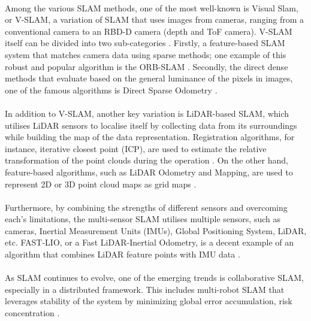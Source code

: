 \paragraph*{}
Among the various SLAM methods, one of the most well-known is Visual Slam, or V-SLAM, a variation of SLAM that uses images from cameras, ranging from a conventional camera to an RBD-D camera (depth and ToF camera). V-SLAM itself can be divided into two sub-categories \cite{benkis2024survey}. Firstly, a feature-based SLAM system that matches camera data using sparse methods; one example of this robust and popular algorithm is the ORB-SLAM \cite{mur2015orb}. Secondly, the direct dense methods that evaluate based on the general luminance of the pixels in images, one of the famous algorithms is Direct Sparse Odometry \cite{engel2018direct}.

\paragraph*{}
In addition to V-SLAM, another key variation is LiDAR-based SLAM, which utilises LiDAR sensors to localise itself by collecting data from its surroundings while building the map of the data representation. Registration algorithms, for instance, iterative closest point (ICP), are used to estimate the relative transformation of the point clouds during the operation \cite{gu2020review}. On the other hand, feature-based algorithms, such as LiDAR Odometry and Mapping, are used to represent 2D or 3D point cloud maps as grid maps \cite{zhang2014loam}. 

\paragraph*{}
Furthermore, by combining the strengths of different sensors and overcoming each’s limitations, the multi-sensor SLAM utilises multiple sensors, such as cameras, Inertial Measurement Units (IMUs), Global Positioning System, LiDAR, etc. FAST-LIO, or a Fast LiDAR-Inertial Odometry, is a decent example of an algorithm that combines LiDAR feature points with IMU data \cite{xu2021fast}.

\paragraph*{}
As SLAM continues to evolve, one of the emerging trends is collaborative SLAM, especially in a distributed framework. This includes multi-robot SLAM that leverages stability of the system by minimizing global error accumulation, risk concentration \cite{chen2023overview}. 

